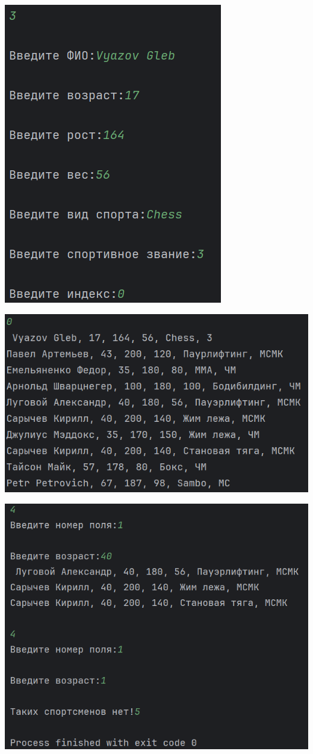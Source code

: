 \documentclass[12pt]{article}
\begin{document}
\includegraphics[scale=0.8]{img3}

\includegraphics[scale=0.8]{img4}

\includegraphics[scale=0.8]{img5}
\end{document}
